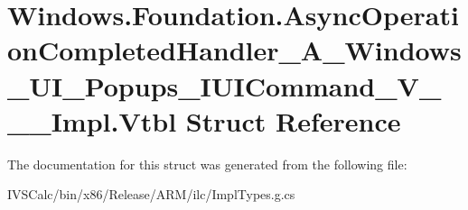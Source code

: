 \hypertarget{struct_windows_1_1_foundation_1_1_async_operation_completed_handler___a___windows___u_i___popupsf6f1991a320a57aa635c69ddc4a52e13}{}\section{Windows.\+Foundation.\+Async\+Operation\+Completed\+Handler\+\_\+\+A\+\_\+\+Windows\+\_\+\+U\+I\+\_\+\+Popups\+\_\+\+I\+U\+I\+Command\+\_\+\+V\+\_\+\+\_\+\+\_\+\+Impl.\+Vtbl Struct Reference}
\label{struct_windows_1_1_foundation_1_1_async_operation_completed_handler___a___windows___u_i___popupsf6f1991a320a57aa635c69ddc4a52e13}


The documentation for this struct was generated from the following file\+:\begin{DoxyCompactItemize}
\item 
I\+V\+S\+Calc/bin/x86/\+Release/\+A\+R\+M/ilc/Impl\+Types.\+g.\+cs\end{DoxyCompactItemize}
